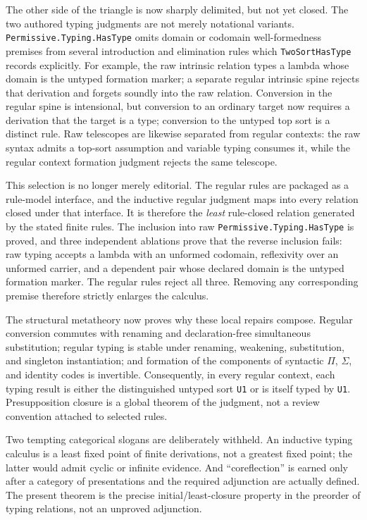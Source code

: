 \documentclass[11pt]{article}
\newcommand{\code}[1]{\texttt{#1}}
\begin{document}
The other side of the triangle is now sharply delimited, but not yet closed.
The two authored typing judgments are not merely notational variants.
\code{Permissive.Typing.HasType} omits domain or codomain well-formedness premises from
several introduction and elimination rules which \code{TwoSortHasType} records
explicitly.  For example, the raw intrinsic relation types a lambda whose domain
is the untyped formation marker; a separate regular intrinsic spine rejects that derivation
and forgets soundly into the raw relation.  Conversion in the regular spine is
intensional, but conversion to an ordinary target now requires a derivation that
the target is a type; conversion to the untyped top sort is a distinct rule.  Raw
telescopes are likewise separated from regular contexts: the raw syntax admits a
top-sort assumption and variable typing consumes it, while the regular context
formation judgment rejects the same telescope.

This selection is no longer merely editorial.  The regular rules are packaged as
a rule-model interface, and the inductive regular judgment maps into every relation
closed under that interface.  It is therefore the \emph{least} rule-closed relation
generated by the stated finite rules.  The inclusion into raw
\code{Permissive.Typing.HasType} is proved, and three independent ablations prove that
the reverse inclusion fails: raw typing accepts a lambda with an unformed
codomain, reflexivity over an unformed carrier, and a dependent pair whose
declared domain is the untyped formation marker. The regular rules reject all three.
Removing any corresponding premise therefore strictly enlarges the calculus.

The structural metatheory now proves why these local repairs compose.  Regular
conversion commutes with renaming and declaration-free simultaneous
substitution; regular typing is stable under renaming, weakening, substitution,
and singleton instantiation; and formation of the components of syntactic
$\Pi$, $\Sigma$, and identity codes is invertible.  Consequently, in every
regular context, each typing result is either the distinguished untyped sort
\code{U1} or is itself typed by \code{U1}.  Presupposition closure is a global
theorem of the judgment, not a review convention attached to selected rules.

Two tempting categorical slogans are deliberately withheld.  An inductive typing
calculus is a least fixed point of finite derivations, not a greatest fixed point;
the latter would admit cyclic or infinite evidence.  And ``coreflection'' is earned
only after a category of presentations and the required adjunction are actually
defined.  The present theorem is the precise initial/least-closure property in the
preorder of typing relations, not an unproved adjunction.
\end{document}
